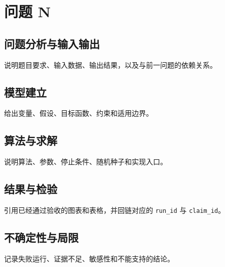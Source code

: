 \section{问题 N}

\subsection{问题分析与输入输出}
说明题目要求、输入数据、输出结果，以及与前一问题的依赖关系。

\subsection{模型建立}
给出变量、假设、目标函数、约束和适用边界。

\subsection{算法与求解}
说明算法、参数、停止条件、随机种子和实现入口。

\subsection{结果与检验}
引用已经通过验收的图表和表格，并回链对应的 \texttt{run\_id} 与 \texttt{claim\_id}。

\subsection{不确定性与局限}
记录失败运行、证据不足、敏感性和不能支持的结论。
